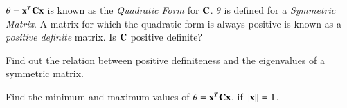 %	
%	
%	
%	
%	
%	
%	
%	
%	
%	
%	
%	
%	
%	

\begin{problem}
$\theta = \mathbf{x}^T\mathbf{C}\mathbf{x}$ is known as the {\em Quadratic Form} for $\mathbf{C}$. $\theta$ is defined for a {\em Symmetric Matrix}.	A matrix for which the quadratic form is always positive is known as a {\em positive definite} matrix.  Is $\mathbf{C}$  positive definite?
\end{problem}
\begin{problem}
	Find out the relation between positive definiteness and the eigenvalues of a symmetric matrix.
\end{problem}

\begin{problem}
	Find the minimum and maximum values of $\theta =\mathbf{x}^T\mathbf{C}\mathbf{x}$, if $\lVert\mathbf{x}\rVert =1$.  
\end{problem}

